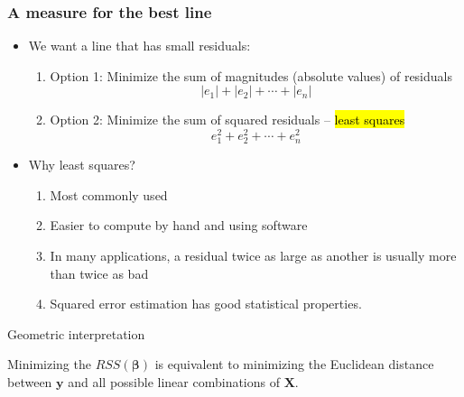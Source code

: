 \begin{frame}
\frametitle{A measure for the best line}

\begin{itemize}

\item We want a line that has small residuals:
\pause
\begin{enumerate}
\item Option 1: Minimize the sum of magnitudes (absolute values) of residuals
\[ |e_1| + |e_2| + \cdots + |e_n| \]
\pause
\item Option 2: Minimize the sum of squared residuals -- \hl{least squares}
\[ e_1^2 + e_2^2 + \cdots + e_n^2 \]
\end{enumerate}

\pause

\item Why least squares?
\begin{enumerate}
\item Most commonly used
\item Easier to compute by hand and using software
\item In many applications, a residual twice as large as another is usually more than twice as bad
\item Squared error estimation has good statistical properties.
\end{enumerate}

\end{itemize}

\end{frame}


\begin{frame}[t]{Geometric interpretation}

Minimizing the $RSS(\boldsymbol{\beta})$ is equivalent to minimizing the Euclidean distance between $\boldsymbol{y}$ and all possible linear combinations of $\boldsymbol{X}$.

\end{frame}


